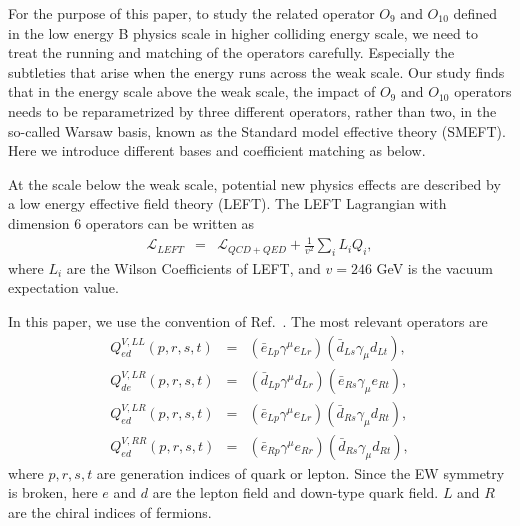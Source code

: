 \documentclass[a4paper,11pt]{article}
\begin{document}
For the purpose of this paper, to study the related operator $O_9$ and $O_{10}$ defined in the low energy B physics scale in higher colliding energy scale, 
we need to treat the running and matching of the operators carefully. 
Especially the subtleties that arise when the energy runs across the weak scale. 
Our study finds that in the energy scale above the weak scale, 
the impact of $O_9$ and $O_{10}$ operators needs to be reparametrized by three different operators, 
rather than two, in the so-called Warsaw basis, known as the Standard model effective theory (SMEFT). 
Here we introduce different bases and coefficient matching as below. 

At the scale below the weak scale, potential new physics effects are described by a low energy effective field theory (LEFT).  
The LEFT Lagrangian with dimension 6 operators can be written as 
\begin{eqnarray}
  \mathcal{L}_{LEFT} &=& \mathcal{L}_{QCD+QED}+ \frac{1}{v^2}\sum_{i}L_iQ_i,  \nonumber 
\end{eqnarray} 
where $L_i$ are the Wilson Coefficients of LEFT, and $v=246$ GeV is the vacuum expectation value. 

In this paper, we use the convention of Ref.~\cite{Jenkins:2017jig}. 
The most relevant operators are 
\begin{eqnarray}
  Q^{V,LL}_{ed}(p,r,s,t) &=& (\bar{e}_{Lp}\gamma^\mu e_{Lr})(\bar{d}_{Ls}\gamma_\mu d_{Lt}),  \label{QVLLed} \\
  Q^{V,LR}_{de}(p,r,s,t) &=& (\bar{d}_{Lp}\gamma^\mu d_{Lr})(\bar{e}_{Rs}\gamma_\mu e_{Rt}),  \label{QVLRde} \\
  Q^{V,LR}_{ed}(p,r,s,t) &=& (\bar{e}_{Lp}\gamma^\mu e_{Lr})(\bar{d}_{Rs}\gamma_\mu d_{Rt}),  \label{QVLRed} \\
  Q^{V,RR}_{ed}(p,r,s,t) &=& (\bar{e}_{Rp}\gamma^\mu e_{Rr})(\bar{d}_{Rs}\gamma_\mu d_{Rt}),  \label{QVRRed}
\end{eqnarray}
where $p,r,s,t$ are generation indices of quark or lepton. 
Since the EW symmetry is broken, here $e$ and $d$ are the lepton field and down-type quark field. 
$L$ and $R$ are the chiral indices of fermions. 
\end{document}
